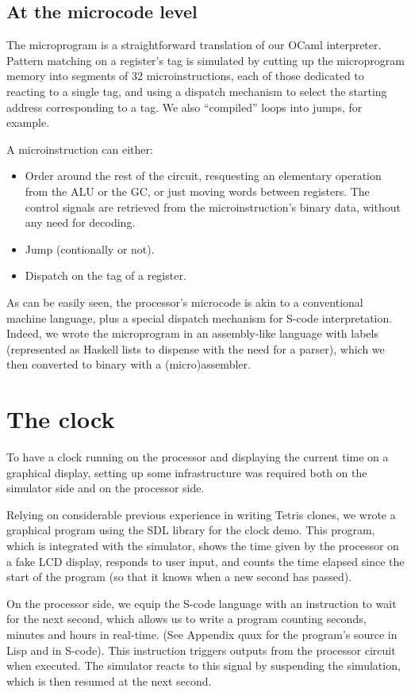 \documentclass[a4paper, 11pt]{article}
\begin{document}
\subsection{At the microcode level}

The microprogram is a straightforward translation of our OCaml interpreter. Pattern matching on a register's tag is simulated by cutting up the microprogram memory into segments of 32 microinstructions, each of those dedicated to reacting to a single tag, and using a dispatch mechanism to select the starting address corresponding to a tag. We also \enquote{compiled} loops into jumps, for example.

A microinstruction can either:
\begin{itemize}
\item Order around the rest of the circuit, resquesting an elementary operation from the ALU or the GC, or just moving words between registers. The control signals are retrieved from the microinstruction's binary data, without any need for decoding.
\item Jump (contionally or not). 
\item Dispatch on the tag of a register.
\end{itemize}
As can be easily seen, the processor's microcode is akin to a conventional machine language, plus a special dispatch mechanism for S-code interpretation. Indeed, we wrote the microprogram in an assembly-like language with labels (represented as Haskell lists to dispense with the need for a parser), which we then converted to binary with a (micro)assembler.


\section{The clock}

To have a clock running on the processor and displaying the current time on a graphical display, setting up some infrastructure was required both on the simulator side and on the processor side.

Relying on considerable previous experience in writing Tetris clones, we wrote a graphical program using the SDL library for the clock demo. This program, which is integrated with the simulator, shows the time given by the processor on a fake LCD display, responds to user input, and counts the time elapsed since the start of the program (so that it knows when a new second has passed). 

On the processor side, we equip the S-code language with an instruction to wait for the next second, which allows us to write a program counting seconds, minutes and hours in real-time. (See Appendix quux for the program's source in Lisp and in S-code). This instruction triggers outputs from the processor circuit when executed. The simulator reacts to this signal by suspending the simulation, which is then resumed at the next second. 
\end{document}
